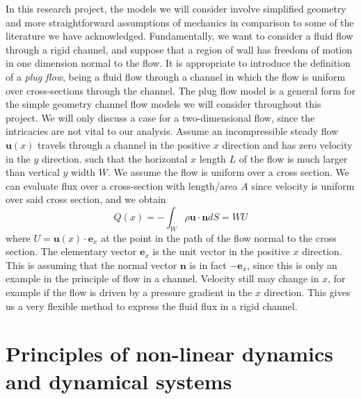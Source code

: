 \documentclass{report}
\begin{document}
In this research project, the models we will consider involve simplified geometry and more straightforward assumptions of mechanics in comparison to some of the literature we have acknowledged.
Fundamentally, we want to consider a fluid flow through a rigid channel, and suppose that a region of wall has freedom of motion in one dimension normal to the flow.
It is appropriate to introduce the definition of a \textit{plug flow}, being a fluid flow through a channel in which the flow is uniform over cross-sections through the channel.
The plug flow model is a general form for the simple geometry channel flow models we will consider throughout this project.
We will only discuss a case for a two-dimensional flow, since the intricacies are not vital to our analysis.
Assume an incompressible steady flow \(\mathbf{u}(x)\) travels through a channel in the positive $x$ direction and has zero velocity in the $y$ direction.
such that the horizontal $x$ length $L$ of the flow is much larger than vertical $y$ width $W$.
We assume the flow is uniform over a cross section.
We can evaluate flux over a cross-section with length/area $A$
since velocity is uniform over said cross section, and we obtain
\begin{equation}
	Q(x) = -\int_W \rho \mathbf{u}\cdot \mathbf{n} dS = WU
\end{equation}
where $U = \mathbf{u}(x) \cdot \mathbf{e}_x $ at the point in the path of the flow normal to the cross section.
The elementary vector $\mathbf{e}_x$ is the unit vector in the positive $x$ direction.
This is assuming that the normal vector $\mathbf{n}$ is in fact $-\mathbf{e}_x$,
since this is only an example in the principle of flow in a channel.
Velocity still may change in $x$, for example if the flow is driven by a pressure gradient in the $x$ direction.
This gives us a very flexible method to express the fluid flux in a rigid channel.

\section{Principles of non-linear dynamics and dynamical systems}
\end{document}
